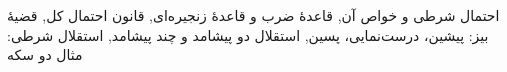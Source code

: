 \documentclass[a4paper,11pt,oneside,openany]{book}
\begin{document}
  {{احتمال شرطی و خواص آن},
   {قاعدهٔ ضرب و قاعدهٔ زنجیره‌ای},
   {قانون احتمال کل},
   {قضیهٔ بیز: پیشین، درست‌نمایی، پسین},
   {استقلال دو پیشامد و چند پیشامد},
   {استقلال شرطی: مثال دو سکه}}

\mainmatter
\setcounter{chapter}{3}   %

\end{document}
